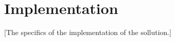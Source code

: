 \section{Implementation}\label{Implementation}
    [The specifics of the implementation of the sollution.]
